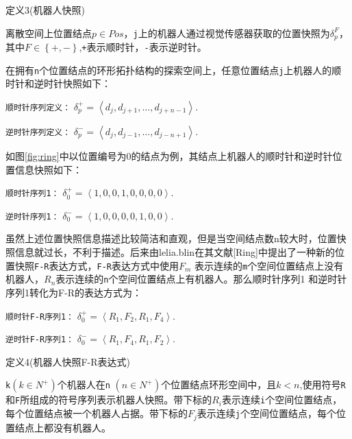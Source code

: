 \vspace{0.5cm}

\begin{bfseries} 定义3\quad(机器人快照)\end{bfseries}离散空间上位置结点$p \in Pos$，\verb|j|上的机器人通过视觉传感器获取的位置快照为$\delta_p^F$，其中$F \in \left\{+,-\right\} $,\verb|+|表示顺时针，\verb|-|表示逆时针。

\vspace{0.5cm}

在拥有\verb|n|个位置结点的环形拓扑结构的探索空间上，任意位置结点\verb|j|上机器人的顺时针和逆时针快照如下：

\verb|顺时针序列定义：| $\delta_p^+ = \left\langle d_j,d_{j+1},...,d_{j+n-1}  \right\rangle.$

\verb|逆时针序列定义：| $\delta_p^- = \left\langle d_j,d_{j-1},...,d_{j-n+1}  \right\rangle.$

如图\ref{fig:ring}中以位置编号为0的结点为例，其结点上机器人的顺时针和逆时针位置信息快照如下：

\verb|顺时针序列1：| $\delta_0^+ = \left\langle 1,0,0,1,0,0,0,0  \right\rangle.$

\verb|逆时针序列1：| $\delta_0^- = \left\langle 1,0,0,0,0,1,0,0  \right\rangle.$

虽然上述位置快照信息描述比较简洁和直观，但是当空间结点数n较大时，位置快照信息就过长，不利于描述。后来由lelia.blin在其文献[Ring]中提出了一种新的位置快照\verb|F-R|表达方式，\verb|F-R|表达方式中使用$F_m$ 表示连续的\verb|m|个空间位置结点上没有机器人，$R_n$表示连续的\verb|n|个空间位置结点上有机器人。那么顺时针序列1 和逆时针序列1转化为F-R的表达方式为：

\verb|顺时针F-R序列1：| $\delta_0^+ = \left\langle R_1,F_2,R_1,F_4  \right\rangle.$

\verb|逆时针F-R序列1：| $\delta_0^- = \left\langle R_1,F_4,R_1,F_2   \right\rangle.$

\vspace{0.5cm}

\begin{bfseries} 定义4\quad(机器人快照F-R表达式)\end{bfseries}\verb|k|$\left(k \in N^+  \right)$个机器人在\verb|n| $\left(n \in N^+  \right)$个位置结点环形空间中，且$k < n$,使用符号\verb|R|和\verb|F|所组成的符号序列表示机器人快照。带下标的$R_i$表示连续\verb|i|个空间位置结点，每个位置结点被一个机器人占据。带下标的$F_j$表示连续\verb|j|个空间位置结点，每个位置结点上都没有机器人。

\vspace{0.5cm}

